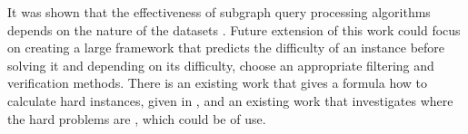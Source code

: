 \documentclass{l4proj}
\begin{document}
It was shown that the effectiveness of subgraph query processing algorithms depends on the nature of the datasets \cite{CP2015}. Future extension of this work could focus on creating a large framework that predicts the difficulty of an instance before solving it and depending on its difficulty, choose an appropriate filtering and verification methods. There is an existing work that gives a formula how to calculate hard instances, given in \cite{Gent:1996}, and an existing work that investigates where the hard problems are \cite{Cheeseman:1991}, which could be of use.




\printglossary
\printglossary[type=\acronymtype]
\end{document}
